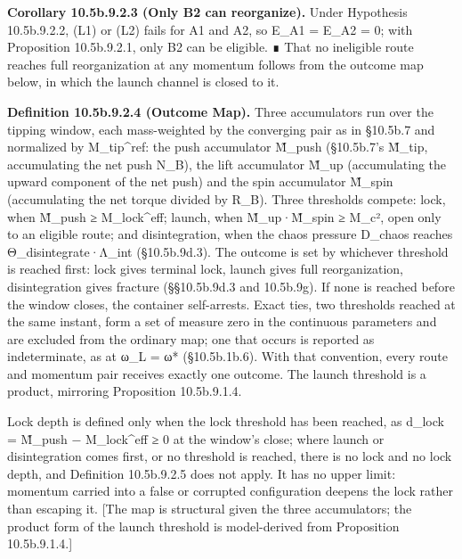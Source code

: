 \documentclass[
]{article}
\begin{document}
\textbf{Corollary 10.5b.9.2.3 (Only B2 can reorganize).} Under
Hypothesis 10.5b.9.2.2, (L1) or (L2) fails for A1 and A2, so E\_A1 =
E\_A2 = 0; with Proposition 10.5b.9.2.1, only B2 can be eligible. ∎ That
no ineligible route reaches full reorganization at any momentum follows
from the outcome map below, in which the launch channel is closed to it.

\textbf{Definition 10.5b.9.2.4 (Outcome Map).} Three accumulators run
over the tipping window, each mass-weighted by the converging pair as in
§10.5b.7 and normalized by M\_tip\^{}ref: the push accumulator M̃\_push
(§10.5b.7's M̃\_tip, accumulating the net push N\_B), the lift
accumulator M̃\_up (accumulating the upward component of the net push)
and the spin accumulator M̃\_spin (accumulating the net torque divided by
R\_B). Three thresholds compete: lock, when M̃\_push ≥ M\_lock\^{}eff;
launch, when M̃\_up·M̃\_spin ≥ M\_c², open only to an eligible route; and
disintegration, when the chaos pressure D\_chaos reaches
Θ\_disintegrate·Λ\_int (§10.5b.9d.3). The outcome is set by whichever
threshold is reached first: lock gives terminal lock, launch gives full
reorganization, disintegration gives fracture (§§10.5b.9d.3 and
10.5b.9g). If none is reached before the window closes, the container
self-arrests. Exact ties, two thresholds reached at the same instant,
form a set of measure zero in the continuous parameters and are excluded
from the ordinary map; one that occurs is reported as indeterminate, as
at ω\_L = ω* (§10.5b.1b.6). With that convention, every route and
momentum pair receives exactly one outcome. The launch threshold is a
product, mirroring Proposition 10.5b.9.1.4.

Lock depth is defined only when the lock threshold has been reached, as
d\_lock = M̃\_push − M\_lock\^{}eff ≥ 0 at the window's close; where
launch or disintegration comes first, or no threshold is reached, there
is no lock and no lock depth, and Definition 10.5b.9.2.5 does not apply.
It has no upper limit: momentum carried into a false or corrupted
configuration deepens the lock rather than escaping it. {[}The map is
structural given the three accumulators; the product form of the launch
threshold is model-derived from Proposition 10.5b.9.1.4.{]}
\end{document}
